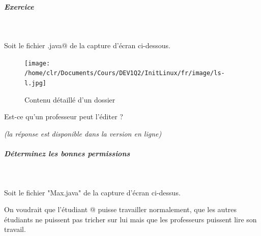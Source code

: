 \documentclass[11pt,a4paper]{article}
\begin{document}
			
		\subparagraph{Exercice } 
		
					\textcolor{white}{.} \par
				
            \par
          
					Soit le fichier \verb@Max.java@ de la capture d'\'ecran ci-dessous.  
				
            \par
        \begin{figure}[hbt]
				    \begin{center}
					\texttt{[image: /home/clr/Documents/Cours/DEV1Q2/InitLinux/fr/image/ls-l.jpg]}
						\end{center}
                
                    \caption[Contenu d\'etaill\'e d'un dossier]{Contenu d\'etaill\'e d'un dossier}
                \end{figure}
                    
					Est-ce qu'un professeur peut l'\'editer ? 
				
            \par
         {\footnotesize\emph{(la r\'eponse est disponible dans la version en ligne)}\par} 
			
		\subparagraph{D\'eterminez les bonnes permissions} 
		
                \textcolor{white}{.} \par
            
							Soit le fichier "Max.java" de la capture d'\'ecran ci-dessus.
							
							On voudrait que l'\'etudiant @ puisse travailler  
							normalement, que les autres \'etudiants ne puissent pas tricher sur  
							lui mais que les professeurs puissent lire son travail.   
						
\end{document}
